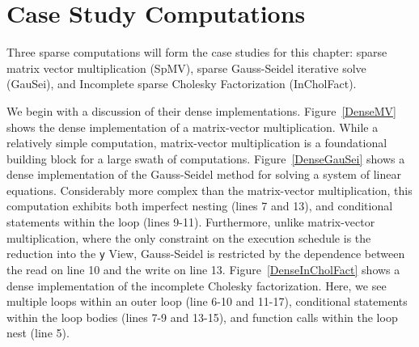 \section{Case Study Computations}

Three sparse computations will form the case studies for this chapter: sparse matrix vector multiplication (SpMV), sparse Gauss-Seidel iterative solve (GauSei), and Incomplete sparse Cholesky Factorization (InCholFact). 

We begin with a discussion of their dense implementations.
Figure~\ref{DenseMV} shows the dense implementation of a matrix-vector multiplication.
While a relatively simple computation, matrix-vector multiplication is a foundational building block for a large swath of computations.
Figure~\ref{DenseGauSei} shows a dense implementation of the Gauss-Seidel method for solving a system of linear equations.
Considerably more complex than the matrix-vector multiplication, this computation exhibits both imperfect nesting (lines 7 and 13), and conditional statements within the loop (lines 9-11). 
Furthermore, unlike matrix-vector multiplication, where the only constraint on the execution schedule is the reduction into the \verb.y. View, Gauss-Seidel is restricted by the dependence between the read on line 10 and the write on line 13. 
Figure~\ref{DenseInCholFact} shows a dense implementation of the incomplete Cholesky factorization. 
Here, we see multiple loops within an outer loop (line 6-10 and 11-17), conditional statements within the loop bodies (lines 7-9 and 13-15), and function calls within the loop nest (line 5).

